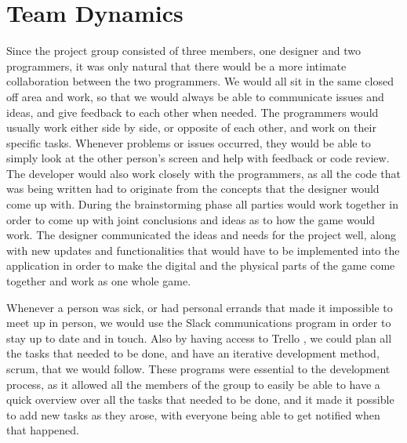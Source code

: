 \section{Team Dynamics}
Since the project group consisted of three members, one designer and two programmers, it was only natural that there would be a more intimate collaboration between the two programmers. We would all sit in the same closed off area and work, so that we would always be able to communicate issues and ideas, and give feedback to each other when needed. The programmers would usually work either side by side, or opposite of each other, and work on their specific tasks. Whenever problems or issues occurred, they would be able to simply look at the other person's screen and help with feedback or code review. The developer would also work closely with the programmers, as all the code that was being written had to originate from the concepts that the designer would come up with. During the brainstorming phase all parties would work together in order to come up with joint conclusions and ideas as to how the game would work. The designer communicated the ideas and needs for the project well, along with new updates and functionalities that would have to be implemented into the application in order to make the digital and the physical parts of the game come together and work as one whole game. 

Whenever a person was sick, or had personal errands that made it impossible to meet up in person, we would use the Slack \cite{prog:slack} communications program in order to stay up to date and in touch. Also by having access to Trello \cite{prog:trello}, we could plan all the tasks that needed to be done, and have an iterative development method, scrum, that we would follow. These programs were essential to the development process, as it allowed all the members of the group to easily be able to have a quick overview over all the tasks that needed to be done, and it made it possible to add new tasks as they arose, with everyone being able to get notified when that happened.

